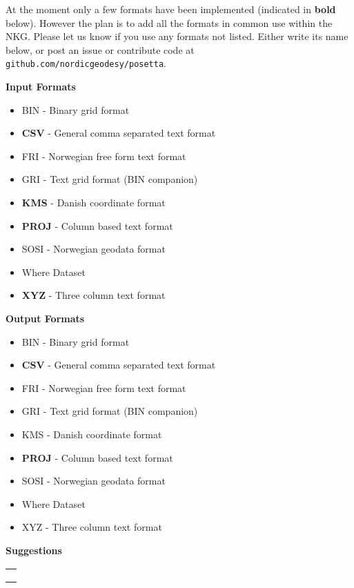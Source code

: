 At the moment only a few formats have been implemented (indicated in \textbf{bold} below). However the plan is to add all the formats in common use within the NKG.  Please let us know if you use any formats not listed. Either write its name below, or post an issue or contribute code at \texttt{github.com/nordicgeodesy/posetta}.

\begin{multicols}{2}
  \textbf{Input Formats}
  
  \begin{itemize}
  \item BIN - Binary grid format
  \item \textbf{CSV} - General comma separated text format
  \item FRI - Norwegian free form text format
  \item GRI - Text grid format (BIN companion)
  \item \textbf{KMS} - Danish coordinate format
  \item \textbf{PROJ} - Column based text format
  \item SOSI - Norwegian geodata format
  \item Where Dataset
  \item \textbf{XYZ} - Three column text format
  \end{itemize}

  \columnbreak
  \textbf{Output Formats}
  
  \begin{itemize}
  \item BIN - Binary grid format
  \item \textbf{CSV} - General comma separated text format
  \item FRI - Norwegian free form text format
  \item GRI - Text grid format (BIN companion)
  \item KMS - Danish coordinate format
  \item \textbf{PROJ} - Column based text format
  \item SOSI - Norwegian geodata format
  \item Where Dataset
  \item XYZ - Three column text format
  \end{itemize}
\end{multicols}

\textbf{Suggestions}
\begin{center}
  \begin{tabularx}{0.9\textwidth}{l}
  \hline \\
  \hline \\
  \hline \\
  \hline \\
  \end{tabularx}
\end{center}
\vspace*{-1.4cm}  %

\endinput
        
